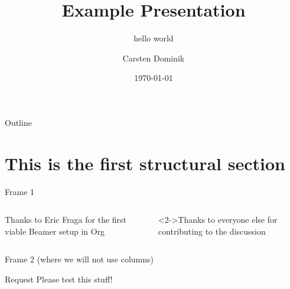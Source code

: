 \documentclass[presentation]{beamer}
\date{\today}
\begin{document}
\title{Example Presentation}
\subtitle{hello world}
\author{Carsten Dominik}

\maketitle
\begin{frame}{Outline}
\tableofcontents
\end{frame}



\section{This is the first structural section}
\label{sec:org2be668a}

\begin{frame}[label={sec:org248ab72}]{Frame 1}
\begin{columns}
\begin{column}{0.48\columnwidth}
\begin{block}{Thanks to Eric Fraga}
for the first viable Beamer setup in Org
\end{block}
\end{column}
\begin{column}{0.48\columnwidth}
\begin{block}<2->{Thanks to everyone else}
for contributing to the discussion
\end{block}
\end{column}
\end{columns}
\end{frame}
\begin{frame}[label={sec:org379d8a1}]{Frame 2 (where we will not use columns)}
\begin{block}{Request}
Please test this stuff!
\end{block}
\end{frame}
\end{document}
